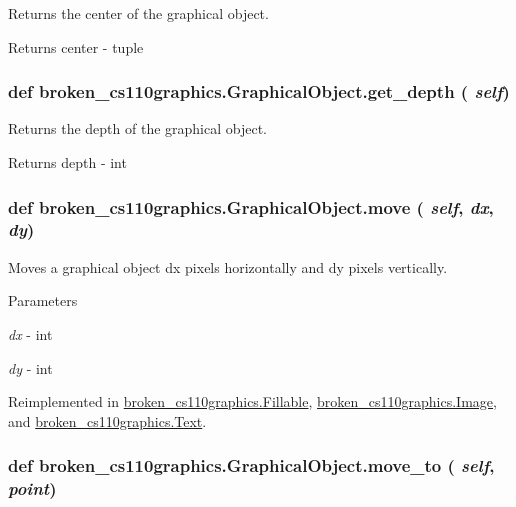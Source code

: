 Returns the center of the graphical object. \begin{DoxyReturn}{Returns}
center -\/ tuple 
\end{DoxyReturn}
\hypertarget{classbroken__cs110graphics_1_1GraphicalObject_a308b73d50adab0e04c16dc65dd9225d9}{
\subsubsection[{get\_\-depth}]{\setlength{\rightskip}{0pt plus 5cm}def broken\_\-cs110graphics.GraphicalObject.get\_\-depth ( {\em self})}}
\label{classbroken__cs110graphics_1_1GraphicalObject_a308b73d50adab0e04c16dc65dd9225d9}


Returns the depth of the graphical object. \begin{DoxyReturn}{Returns}
depth -\/ int 
\end{DoxyReturn}
\hypertarget{classbroken__cs110graphics_1_1GraphicalObject_aebbdd098df38319fa08db41caad93282}{
\subsubsection[{move}]{\setlength{\rightskip}{0pt plus 5cm}def broken\_\-cs110graphics.GraphicalObject.move ( {\em self}, \/   {\em dx}, \/   {\em dy})}}
\label{classbroken__cs110graphics_1_1GraphicalObject_aebbdd098df38319fa08db41caad93282}


Moves a graphical object dx pixels horizontally and dy pixels vertically. 
\begin{DoxyParams}{Parameters}
\item[{\em dx}]-\/ int \item[{\em dy}]-\/ int \end{DoxyParams}


Reimplemented in \hyperlink{classbroken__cs110graphics_1_1Fillable_ae0a64b349be4d163ccf5759cf3d7f0bb}{broken\_\-cs110graphics.Fillable}, \hyperlink{classbroken__cs110graphics_1_1Image_a3f251e1a4abf1d9bd47034ca1f2108da}{broken\_\-cs110graphics.Image}, and \hyperlink{classbroken__cs110graphics_1_1Text_af3be5a72b80b128967fba27b7d9ddaa1}{broken\_\-cs110graphics.Text}.\hypertarget{classbroken__cs110graphics_1_1GraphicalObject_ad41f02c6b8a874f21ca63bcb6a0320c5}{
\subsubsection[{move\_\-to}]{\setlength{\rightskip}{0pt plus 5cm}def broken\_\-cs110graphics.GraphicalObject.move\_\-to ( {\em self}, \/   {\em point})}}
\label{classbroken__cs110graphics_1_1GraphicalObject_ad41f02c6b8a874f21ca63bcb6a0320c5}


